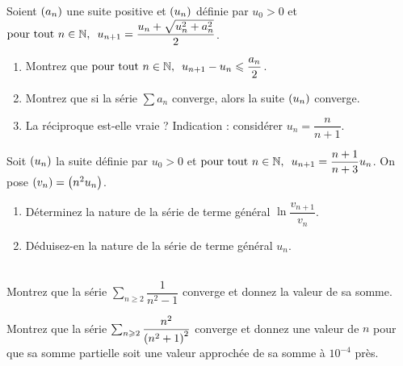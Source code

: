 \begin{corr}
\end{corr}

\begin{exo}
Soient \(\left(a_n\right)\) une suite positive et \(\left(u_n\right)\) définie par \(u_0>0\) et \(\quantifs{\tpt n\in\N}u_{n+1}=\dfrac{u_n+\sqrt{u_n^2+a_n^2}}{2}\).

\begin{enumerate}
    \item Montrez que \(\quantifs{\tpt n\in\N}u_{n+1}-u_n\leq\dfrac{a_n}{2}\). \\
    \item Montrez que si la série \(\sum a_n\) converge, alors la suite \(\left(u_n\right)\) converge. \\
    \item La réciproque est-elle vraie ? Indication : considérer \(u_n=\dfrac{n}{n+1}\).
\end{enumerate}
\end{exo}

\begin{corr}
\end{corr}

\begin{exo}
Soit \(\left(u_n\right)\) la suite définie par \(u_0>0\) et \(\quantifs{\tpt n\in\N}u_{n+1}=\dfrac{n+1}{n+3}u_n\). On pose \(\left(v_n\right)=\left(n^2u_n\right)\).

\begin{enumerate}
    \item Déterminez la nature de la série de terme général \(\ln\dfrac{v_{n+1}}{v_n}\). \\
    \item Déduisez-en la nature de la série de terme général \(u_n\).
\end{enumerate}
\end{exo}

\begin{corr}
\end{corr}

\begin{exo}~\\
Montrez que la série \(\sum_{n\geq2}\dfrac{1}{n^2-1}\) converge et donnez la valeur de sa somme.

Montrez que la série \(\sum_{n\geqslant2}\dfrac{n^2}{\left(n^2+1\right)^2}\) converge et donnez une valeur de \(n\) pour que sa somme partielle soit une valeur approchée de sa somme à \(10^{-4}\) près.
\end{exo}


